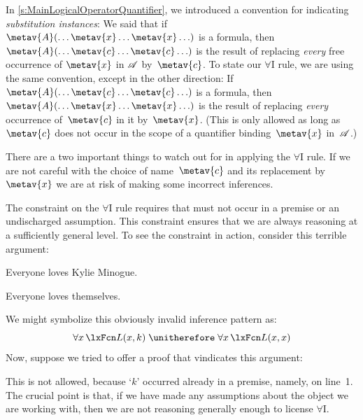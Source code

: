 In \cref{s:MainLogicalOperatorQuantifier}, we introduced a convention
for indicating \emph{substitution instances}: We said that if
$\metav{A}(\ldots \metav{x} \ldots \metav{x}\ldots)$ is a formula,
then $\metav{A}(\ldots \metav{c} \ldots \metav{c}\ldots)$ is the
result of replacing \emph{every} free occurrence of $\metav{x}$ in
$\mathscr{A}$ by~$\metav{c}$. To state our $\forall$I rule, we are using
the same convention, except in the other direction: If
$\metav{A}(\ldots \metav{c} \ldots \metav{c}\ldots)$ is a formula,
then $\metav{A}(\ldots \metav{x} \ldots \metav{x}\ldots)$ is the
result of replacing \emph{every} occurrence of~$\metav{c}$ in it
by~$\metav{x}$. (This is only allowed as long as $\metav{c}$ does not
occur in the scope of a quantifier binding~$\metav{x}$ in~$\mathscr{A}$.)

There are a two important things to watch out for in applying the
$\forall$I rule. If we are not careful with the choice of
name~$\metav{c}$ and its replacement by~$\metav{x}$ we are at risk of
making some incorrect inferences.

The constraint on the $\forall$I rule requires that  must not
occur in a premise or an undischarged assumption. This constraint
ensures that we are always reasoning at a sufficiently general level.
To see the constraint in action, consider this terrible argument:
	\begin{earg}
		\item Everyone loves Kylie Minogue.
		\item[\texttherefore] Everyone loves themselves.
	\end{earg}
We might symbolize this obviously invalid inference pattern as:
$$\forall x\,\atom{L}{x,k} \therefore \forall x\,\atom{L}{x,x}$$
Now, suppose we tried to offer a proof that vindicates this argument:
\begin{fitchproof}
	\PR
	 
	 
\end{fitchproof}
This is not allowed, because `$k$' occurred already in a premise, namely, on line~1. The crucial point is that, if we have made any assumptions about the object we are working with, then we are not reasoning generally enough to license $\forall$I.


